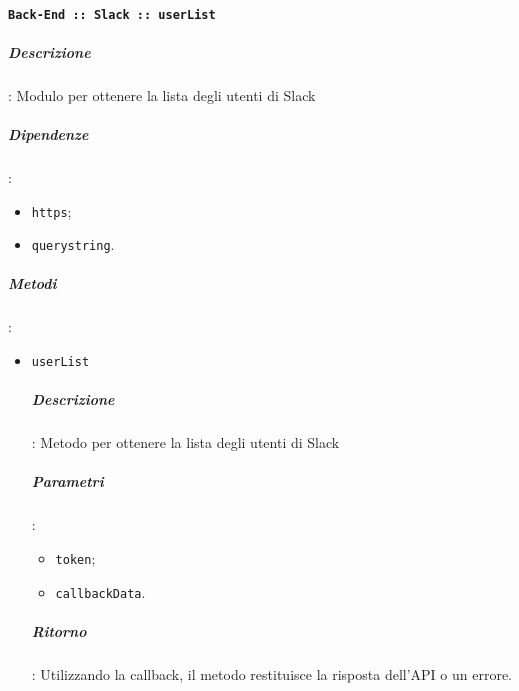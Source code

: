 \documentclass[../DefinizioneDiProdotto_v3.0.0.tex]{subfiles}
\begin{document}
\paragraph{\texttt{Back-End :: Slack :: userList}}
\subparagraph{Descrizione}: Modulo per ottenere la lista degli utenti di Slack
\subparagraph{Dipendenze}:
\begin{itemize}
	\item \texttt{https};
	\item \texttt{querystring}.
\end{itemize}
\subparagraph{Metodi}:
\begin{itemize}
	\item \texttt{userList}
	      \subparagraph{Descrizione}: Metodo per ottenere la lista degli utenti di Slack
	      \subparagraph{Parametri}:
	      \begin{itemize}
	      	\item \texttt{token};
	      	\item \texttt{callbackData}.
	      \end{itemize}
	      \subparagraph{Ritorno}: Utilizzando la callback, il metodo restituisce la risposta dell'API o un errore.
\end{itemize}

\newpage
\end{document}
